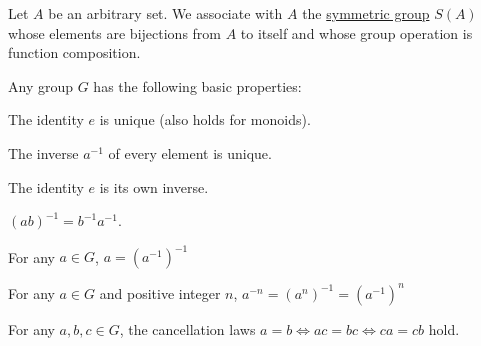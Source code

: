 \begin{definition}\label{def:symmetric_group}
  Let $A$ be an arbitrary set. We associate with $A$ the \uline{symmetric group} $S(A)$ whose elements are bijections from $A$ to itself and whose group operation is function composition.
\end{definition}

\begin{proposition}\label{def:group_properties}
  Any group $G$ has the following basic properties:
  \begin{defenum}
    \item\label{def:group_properties/unique_identity} The identity $e$ is unique (also holds for monoids).
    \item\label{def:group_properties/unique_inverse} The inverse $a^{-1}$ of every element is unique.
    \item\label{def:group_properties/identity_inverse} The identity $e$ is its own inverse.
    \item\label{def:group_properties/inverse_composition} $(ab)^{-1} = b^{-1} a^{-1}$.
    \item\label{def:group_properties/double_inverse} For any $a \in G$, $a = (a^{-1})^{-1}$
    \item\label{def:group_properties/negative_power} For any $a \in G$ and positive integer $n$, $a^{-n} = (a^n)^{-1} = (a^{-1})^n$
    \item\label{def:group_properties/cancellation} For any $a, b, c \in G$, the cancellation laws $a = b \iff ac = bc \iff ca = cb$ hold.
  \end{defenum}
\end{proposition}
